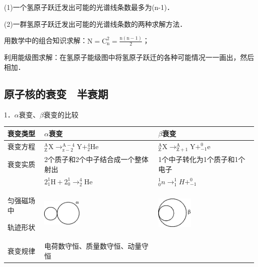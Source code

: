 (1)一个氢原子跃迁发出可能的光谱线条数最多为(n-1)．

(2)一群氢原子跃迁发出可能的光谱线条数的两种求解方法．

用数学中的组合知识求解：$\mathrm{N}=\mathrm{C}_{\mathrm{n}}^{2}=\frac{\mathrm{n}(\mathrm{n}-1)}{2}$；

利用能级图求解：在氢原子能级图中将氢原子跃迁的各种可能情况一一画出，然后相加．
\newpage
\subsection{原子核的衰变　半衰期}

1．$\alpha$衰变、$\beta$衰变的比较

\begin{longtable}[]{@{}m{2cm}m{5cm}m{5cm}@{}}
\toprule
衰变类型 & $\alpha$衰变 & $\beta$衰变\tabularnewline
\midrule
\endhead
衰变方程 & $_{\mathrm{Z}}^{\mathrm{A}} \mathrm{X} \longrightarrow_{\mathrm{z}-2}^{\mathrm{A}-4} \mathrm{Y}+_{2}^{4} \mathrm{He}$ & $_{\mathrm{Z}}^{\mathrm{A}} \mathrm{X} \rightarrow_{\mathrm{Z}+1}^{\mathrm{A}} \mathrm{Y}+_{-1}^{0} \mathrm{e}$\tabularnewline
衰变实质 & 2个质子和2个中子结合成一个整体射出 &
1个中子转化为1个质子和1个电子\tabularnewline
& $2_{1}^{1} \mathrm{H}+2_{0}^{1} \longrightarrow_{2}^{4} \mathrm{He}$ & $_{0}^{1} n \rightarrow_{1}^{1} H+_{-1}^{0}$\tabularnewline
\begin{minipage}[t]{0.30\columnwidth}\raggedright
匀强磁场中

轨迹形状\strut
\end{minipage} & \begin{minipage}[t]{0.30\columnwidth}\raggedright
\includegraphics[width=0.73611in,height=0.49028in]{media/image480.png}\strut
\end{minipage} & \begin{minipage}[t]{0.30\columnwidth}\raggedright
\includegraphics[width=0.68889in,height=0.59444in]{media/image481.png}\strut
\end{minipage}\tabularnewline
衰变规律 & 电荷数守恒、质量数守恒、动量守恒 &\tabularnewline
\bottomrule
\end{longtable}

